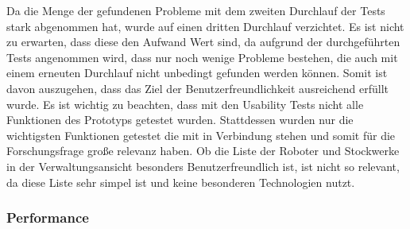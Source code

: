 Da die Menge der gefundenen Probleme mit dem zweiten Durchlauf der Tests stark abgenommen hat, wurde auf einen dritten Durchlauf verzichtet. Es ist nicht zu erwarten, dass diese den Aufwand Wert sind, da aufgrund der durchgeführten Tests angenommen wird, dass nur noch wenige Probleme bestehen, die auch mit einem erneuten Durchlauf nicht unbedingt gefunden werden können. Somit ist davon auszugehen, dass das Ziel der Benutzerfreundlichkeit ausreichend erfüllt wurde. Es ist wichtig zu beachten, dass mit den Usability Tests nicht alle Funktionen des Prototyps getestet wurden. Stattdessen wurden nur die wichtigsten Funktionen getestet die mit \deckgl in Verbindung stehen und somit für die Forschungsfrage große relevanz haben. Ob die Liste der Roboter und Stockwerke in der Verwaltungsansicht besonders Benutzerfreundlich ist, ist nicht so relevant, da diese Liste sehr simpel ist und keine besonderen Technologien nutzt.

\subsubsection{Performance}

